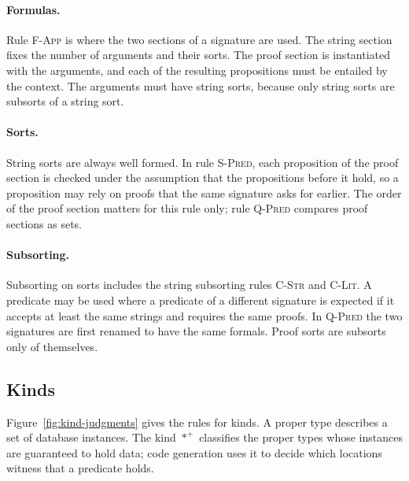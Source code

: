 \documentclass[11pt]{article}
\newcommand{\populated}{\ast^{+}}
\newcommand{\rulename}[1]{\textsc{#1}}
\theoremstyle{remark}
\begin{document}
\paragraph{Formulas.} Rule \rulename{F-App} is where the two sections of a signature are used. The
string section fixes the number of arguments and their sorts. The proof section is instantiated
with the arguments, and each of the resulting propositions must be entailed by the context. The
arguments must have string sorts, because only string sorts are subsorts of a string sort.

\paragraph{Sorts.} String sorts are always well formed. In rule \rulename{S-Pred}, each proposition
of the proof section is checked under the assumption that the propositions before it hold, so a
proposition may rely on proofs that the same signature asks for earlier. The order of the proof
section matters for this rule only; rule \rulename{Q-Pred} compares proof sections as sets.

\paragraph{Subsorting.} Subsorting on sorts includes the string subsorting rules \rulename{C-Str}
and \rulename{C-Lit}. A predicate may be used where a predicate of a different signature is
expected if it accepts at least the same strings and requires the same proofs. In
\rulename{Q-Pred} the two signatures are first renamed to have the same formals. Proof sorts
are subsorts only of themselves.

\FloatBarrier
\subsection{Kinds}

Figure~\ref{fig:kind-judgments} gives the rules for kinds. A proper type describes a set of
database instances. The kind $\populated$ classifies the proper types whose instances are
guaranteed to hold data; code generation uses it to decide which locations witness that a
predicate holds.
\end{document}
